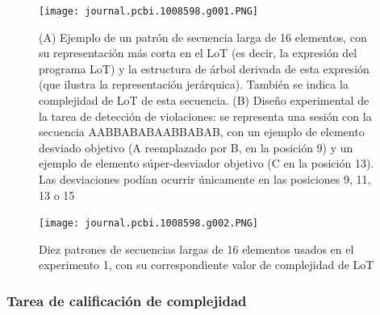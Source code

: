 \begin{figure}[t!]
   \texttt{[image: journal.pcbi.1008598.g001.PNG]}
   
   \centering
   
   \caption{(A) Ejemplo de un patrón de secuencia larga de 16 elementos, con su representación más corta en el LoT (es decir, la expresión del programa LoT) y la estructura de árbol derivada de esta expresión (que ilustra la representación jerárquica). También se indica la complejidad de LoT de esta secuencia. (B) Diseño experimental de la tarea de detección de violaciones: se representa una sesión con la secuencia AABBABABAABBABAB, con un ejemplo de elemento desviado objetivo (A reemplazado por B, en la posición 9) y un ejemplo de elemento súper-desviador objetivo (C en la posición 13). Las desviaciones podían ocurrir únicamente en las posiciones 9, 11, 13 o 15}
   \label{PlosBIO-F1}
\end{figure}

\begin{figure}[t!]
   \texttt{[image: journal.pcbi.1008598.g002.PNG]}
   \centering
   \caption{Diez patrones de secuencias largas de 16 elementos usados en el experimento 1, con su correspondiente valor de complejidad de LoT}
   \label{PlosBIO-F2}
\end{figure}

\subsubsection*{Tarea de calificación de complejidad}


